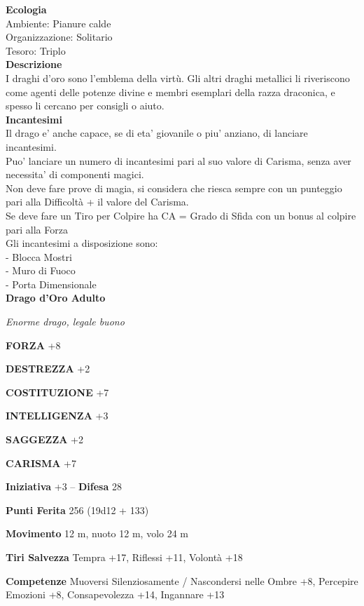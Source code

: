 \begin{multicols}{2}
\textbf{Ecologia}\\
Ambiente: Pianure calde\\
Organizzazione: Solitario\\
Tesoro: Triplo\\
\textbf{Descrizione}\\
I draghi d'oro sono l'emblema della virtù. Gli altri draghi metallici li riveriscono come agenti delle potenze divine e membri esemplari della razza draconica, e spesso li cercano per consigli o aiuto.\\
\textbf{Incantesimi}\\
Il drago e' anche capace, se di eta' giovanile o piu' anziano, di lanciare incantesimi.\\
Puo' lanciare un numero di incantesimi pari al suo valore di Carisma, senza aver necessita' di componenti magici.\\
Non deve fare prove di magia, si considera che riesca sempre con un punteggio pari alla Difficoltà + il valore del Carisma.\\
Se deve fare un Tiro per Colpire ha CA = Grado di Sfida con un bonus al colpire pari alla Forza\\
Gli incantesimi a disposizione sono:\\
- Blocca Mostri\\
- Muro di Fuoco\\
- Porta Dimensionale\\

\medskip{}\textbf{Drago d'Oro Adulto}

\emph{Enorme drago, legale buono}

\textbf{FORZA} +8

\textbf{DESTREZZA} +2

\textbf{COSTITUZIONE} +7

\textbf{INTELLIGENZA} +3

\textbf{SAGGEZZA} +2

\textbf{CARISMA} +7

\textbf{Iniziativa} +3 -- \textbf{Difesa} 28

\textbf{Punti Ferita} 256 (19d12 + 133)

\textbf{Movimento} 12 m, nuoto 12 m, volo 24 m

\textbf{Tiri Salvezza} Tempra +17, Riflessi +11, Volontà +18

\textbf{Competenze} Muoversi Silenziosamente / Nascondersi nelle Ombre +8, Percepire Emozioni +8, Consapevolezza +14, Ingannare +13 


\end{multicols}
